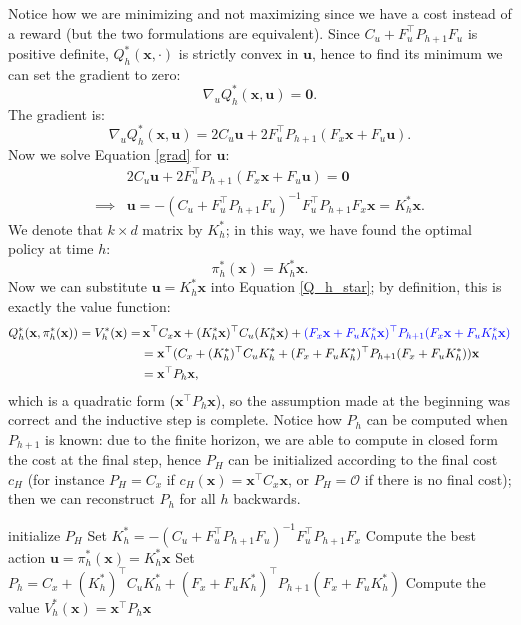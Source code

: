 \documentclass[10pt, a4paper]{report}
\begin{document}
Notice how we are minimizing and not maximizing since we have a cost instead of a reward (but the two formulations are equivalent). Since $C_u+F_u^\top P_{h+1}F_u$ is positive definite, $Q_h^*(\mathbf x,\cdot)$ is strictly convex in $\mathbf u$, hence to find its minimum we can set the gradient to zero:\begin{equation}\label{grad}
    \nabla_u Q_h^*(\mathbf x,\mathbf u)=\mathbf 0.
\end{equation}
The gradient is:
\begin{equation}
     \nabla_u Q_h^*(\mathbf x,\mathbf u)=
     2C_u\mathbf u+2F_u^\top P_{h+1}(F_x\mathbf x+F_u\mathbf u).
\end{equation}
Now we solve Equation \eqref{grad} for $\mathbf u$:
\begin{align}
    & 2C_u\mathbf u+2F_u^\top P_{h+1}(F_x\mathbf x+F_u\mathbf u)=\mathbf 0 \\ 
     \implies&\mathbf u = -(C_u+F_u^\top P_{h+1}F_u)^{-1}F_u^\top P_{h+1}F_x\mathbf x=K_h^* \mathbf x.
\end{align}
We denote that $k\times d$ matrix by $K_h^*$; in this way, we have found the optimal policy at time $h$:\begin{equation}
    \pi_h^*(\mathbf x)=K_h^* \mathbf x.
\end{equation}
Now we can substitute $\mathbf u =K_h^* \mathbf x $ into Equation \eqref{Q_h_star}; by definition, this is exactly the value function:\begin{align} Q_h^*(\mathbf x,\pi_h^*(\mathbf x))=V^*_h(\mathbf x)=&\,
    \mathbf x^\top C_x\mathbf x+
    (K_h^* \mathbf x)^\top C_u(K_h^* \mathbf x)+\color{blue}(F_x\mathbf x+F_uK_h^* \mathbf x)^\top P_{h+1}(F_x\mathbf x+F_uK_h^* \mathbf x)\color{black}\\
&=\mathbf x^\top(
    C_x+(K_h^*)^\top C_u K_h^* + 
    (F_x+F_uK_h^*)^\top  P_{h+1} (F_x+F_uK_h^*)
)\mathbf x\\ &=\mathbf x^\top P_h\mathbf x,
\end{align}
which is a quadratic form ($\mathbf x^\top P_h\mathbf x$), so the assumption made at the beginning was correct and the inductive step is complete. Notice how $P_h$ can be computed when $P_{h+1}$ is known: due to the finite horizon, we are able to compute in closed form the cost at the final step, hence $P_H$ can be initialized according to the final cost $c_H$ (for instance $P_H=C_x$ if $c_H(\mathbf x)=\mathbf x^\top C_x\mathbf x$, or $P_H=\mathcal O$ if there is no final cost); then we can reconstruct $P_h$ for all $h$ backwards.
\begin{algorithm}[H]
\caption{Value Iteration as LQR}\label{alg:value_iteration_LQR}
\begin{algorithmic}[1]
    \State initialize $P_H$
    \State Set $K_h^*=-(C_u+F_u^\top P_{h+1}F_u)^{-1}F_u^\top P_{h+1}F_x$
    \State Compute the best action $\mathbf u=\pi_h^*(\mathbf x)=K_h^*\mathbf x$
    \State Set $P_h=C_x+(K_h^*)^\top C_u K_h^* + 
    (F_x+F_uK_h^*)^\top  P_{h+1} (F_x+F_uK_h^*)$
    \State Compute the value $V_h^*(\mathbf x)=\mathbf x^\top P_h\mathbf x$
    \EndFor
\end{algorithmic}
\end{algorithm}
\end{document}
